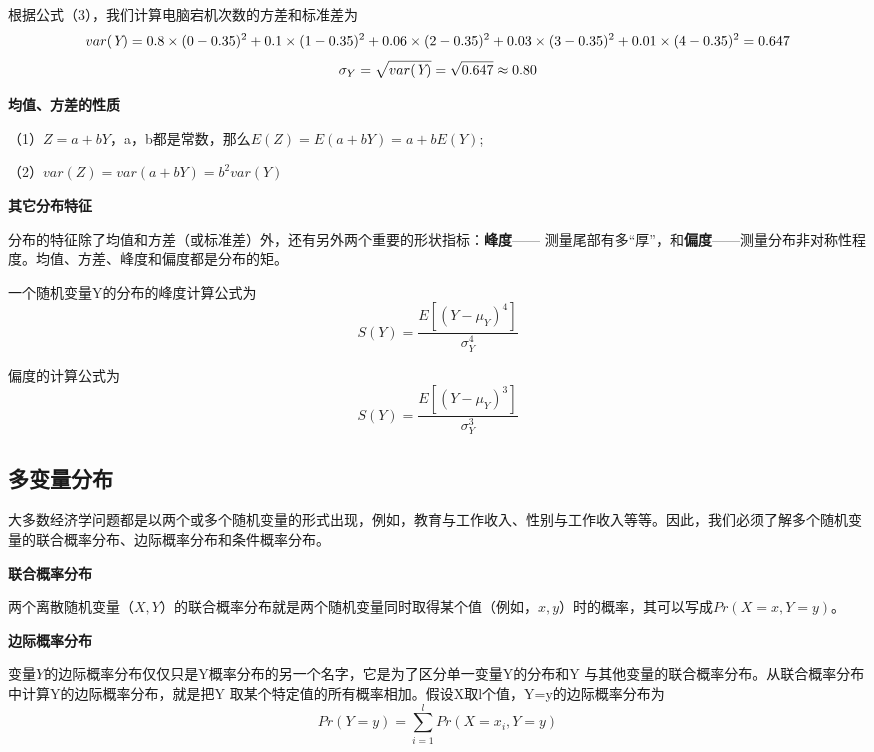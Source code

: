 \documentclass[cn,12pt,math=newtx,citestyle=gb7714-2015,bibstyle=gb7714-2015]{elegantbook}
\begin{document}
	根据公式（3），我们计算电脑宕机次数的方差和标准差为
	\begin{equation}
		var(\emph{Y})=0.8\times(0-0.35)^2+0.1\times(1-0.35)^2+0.06\times(2-0.35)^2+0.03\times(3-0.35)^2+0.01\times(4-0.35)^2=0.647
	\end{equation}
	\begin{equation}
		\sigma_{Y}=\sqrt{var(\emph{Y})}=\sqrt{0.647}\approx0.80
	\end{equation}
	
	\textbf{均值、方差的性质}
	
	（1）$Z=a+bY$，a，b都是常数，那么$E(Z)=E(a+bY)=a+bE(Y)$;
	
	（2）$var(Z)=var(a+bY)=b^2var(Y)$
	
	\textbf{其它分布特征}
	
	分布的特征除了均值和方差（或标准差）外，还有另外两个重要的形状指标：\textbf{峰度}—— 测量尾部有多“厚”，和\textbf{偏度}——测量分布非对称性程度。均值、方差、峰度和偏度都是分布的矩。
	
	一个随机变量Y的分布的峰度计算公式为
	\begin{equation}
		S(Y)=\frac{E\left[(Y-\mu_{Y})^4\right]}{\sigma_{Y}^4}
	\end{equation}
	
	偏度的计算公式为
	\begin{equation}
		S(Y)=\frac{E\left[(Y-\mu_{Y})^3\right]}{\sigma_{Y}^3}
	\end{equation}
	
	\subsection{多变量分布}
	大多数经济学问题都是以两个或多个随机变量的形式出现，例如，教育与工作收入、性别与工作收入等等。因此，我们必须了解多个随机变量的联合概率分布、边际概率分布和条件概率分布。
	
	\textbf{联合概率分布}
	
	两个离散随机变量（$X,Y$）的联合概率分布就是两个随机变量同时取得某个值（例如，$x,y$）时的概率，其可以写成$Pr(X=x,Y=y)$。
	
	\textbf{边际概率分布}
	
	变量$Y$的边际概率分布仅仅只是Y概率分布的另一个名字，它是为了区分单一变量Y的分布和Y 与其他变量的联合概率分布。从联合概率分布中计算Y的边际概率分布，就是把Y 取某个特定值的所有概率相加。假设X取l个值，Y=y的边际概率分布为
	\begin{equation}
		Pr(Y=y)=\sum_{i=1}^{l}{Pr(X=x_i,Y=y)}
	\end{equation}
	
\end{document}
